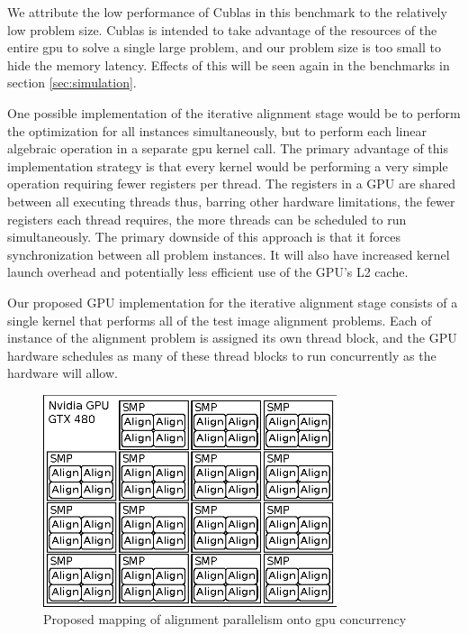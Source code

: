 \documentclass[10pt,twocolumn,letterpaper]{article}
\begin{document}
We attribute the low performance of Cublas in this benchmark to the relatively
low problem size. Cublas is intended to take advantage of the resources of the
entire gpu to solve a single large problem, and our problem size is too small
to hide the memory latency.  Effects of this will be seen again in the
benchmarks in section \ref{sec:simulation}.

One possible implementation of the iterative alignment stage would be to
perform the optimization for all instances simultaneously, but to perform each
linear algebraic operation in a separate gpu kernel call.  The primary
advantage of this implementation strategy is that every kernel would be
performing a very simple operation requiring fewer registers per thread.  The
registers in a GPU are shared between all executing threads thus, barring other
hardware limitations, the fewer registers each thread requires, the more
threads can be scheduled to run simultaneously.  The primary downside of this
approach is that it forces synchronization between all problem instances.  It will
also have increased kernel launch overhead and potentially less efficient use of
the GPU's L2 cache.

Our proposed GPU implementation for the iterative alignment stage consists of a
single kernel that performs all of the test image alignment problems.  Each of
instance of the alignment problem is assigned its own thread block, and the GPU
hardware schedules as many of these thread blocks to run concurrently as the 
hardware will allow.  

\begin{figure}
\centering
\includegraphics[width=3.4in]{figures/alignment_mapping_gpu}
\caption{Proposed mapping of alignment parallelism onto gpu concurrency}
\label{fig:alignment_mapping_gpu}
\end{figure}
\end{document}
